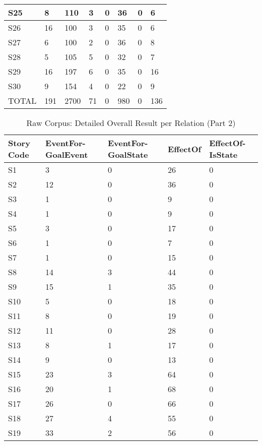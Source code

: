 \begin{table}[H]
\begin{tabular}{|p{1.5cm}|p{.75cm}|p{1.5cm}|p{1cm}|p{1.25cm}|p{1.25cm}|p{1.5cm}|p{1.5cm}|}
S25 & 8 & 110 & 3 & 0 & 36 & 0 & 6 \\ \hline
S26 & 16 & 100 & 3 & 0 & 35 & 0 & 6 \\ \hline
S27 & 6 & 100 & 2 & 0 & 36 & 0 & 8 \\ \hline
S28 & 5 & 105 & 5 & 0 & 32 & 0 & 7 \\ \hline
S29 & 16 & 197 & 6 & 0 & 35 & 0 & 16 \\ \hline
S30 & 9 & 154 & 4 & 0 & 22 & 0 & 9 \\ \hline
TOTAL & 191 & 2700 & 71 & 0 & 980 & 0 & 136 \\ \hline
\end{tabular}
\label{tab:raw1}
\end{table}

\begin{table}[H]   %
\centering
\caption{Raw Corpus: Detailed Overall Result per Relation (Part 2)} \vspace{0.25em}
\begin{tabular}{|l|p{2cm}|p{2cm}|l|p{2cm}|} \hline
\textbf{Story Code} & \textbf{EventFor-GoalEvent} & \textbf{EventFor-GoalState} & \textbf{EffectOf} & \textbf{EffectOf-IsState} \\ \hline
S1 & 3 & 0 & 26 & 0 \\ \hline
S2 & 12 & 0 & 36 & 0 \\ \hline
S3 & 1 & 0 & 9 & 0 \\ \hline
S4 & 1 & 0 & 9 & 0 \\ \hline
S5 & 3 & 0 & 17 & 0 \\ \hline
S6 & 1 & 0 & 7 & 0 \\ \hline
S7 & 1 & 0 & 15 & 0 \\ \hline
S8 & 14 & 3 & 44 & 0 \\ \hline
S9 & 15 & 1 & 35 & 0 \\ \hline
S10 & 5 & 0 & 18 & 0 \\ \hline
S11 & 8 & 0 & 19 & 0 \\ \hline
S12 & 11 & 0 & 28 & 0 \\ \hline
S13 & 8 & 1 & 17 & 0 \\ \hline
S14 & 9 & 0 & 13 & 0 \\ \hline
S15 & 23 & 3 & 64 & 0 \\ \hline
S16 & 20 & 1 & 68 & 0 \\ \hline
S17 & 26 & 0 & 66 & 0 \\ \hline
S18 & 27 & 4 & 55 & 0 \\ \hline
S19 & 33 & 2 & 56 & 0 \\ \hline

\end{tabular}
\end{table}
